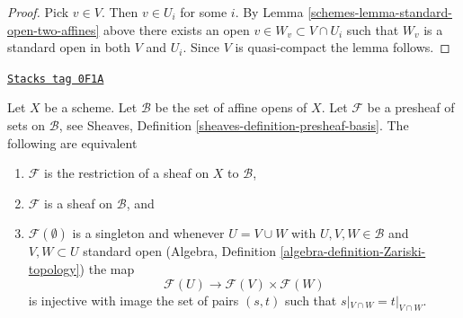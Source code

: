 \begin{proof}

Pick $v \in V$. Then $v \in U_i$ for some $i$.
By Lemma \ref{schemes-lemma-standard-open-two-affines} above there exists an open
$v \in W_v \subset V \cap U_i$ such that
$W_v$ is a standard open in both $V$ and $U_i$.
Since $V$ is quasi-compact the lemma follows.
\end{proof}

\begin{lemma}
\label{schemes-lemma-sheaf-on-affines}
\href{https://stacks.math.columbia.edu/tag/0F1A}{\texttt{Stacks tag 0F1A}}

Let $X$ be a scheme. Let $\mathcal{B}$ be the set of affine opens of $X$.
Let $\mathcal{F}$ be a presheaf of sets on $\mathcal{B}$, see
Sheaves, Definition \ref{sheaves-definition-presheaf-basis}. The following
are equivalent
\begin{enumerate}
\item $\mathcal{F}$ is the restriction of a sheaf on $X$ to $\mathcal{B}$,
\item $\mathcal{F}$ is a sheaf on $\mathcal{B}$, and
\item $\mathcal{F}(\emptyset)$ is a singleton and
whenever $U = V \cup W$ with $U, V, W \in \mathcal{B}$ and
$V, W \subset U$ standard open
(Algebra, Definition \ref{algebra-definition-Zariski-topology})
the map
$$
\mathcal{F}(U) \longrightarrow \mathcal{F}(V) \times \mathcal{F}(W)
$$
is injective with image the set of pairs $(s, t)$
such that $s|_{V \cap W} = t|_{V \cap W}$.
\end{enumerate}
\end{lemma}


